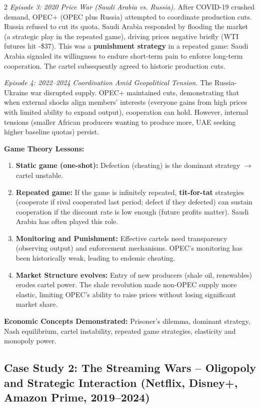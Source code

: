 \documentclass[10pt,a4paper]{article}
\begin{document}
\begin{multicols}{2}
\textit{Episode 3: 2020 Price War (Saudi Arabia vs. Russia).} After COVID-19 crushed demand, OPEC+ (OPEC plus Russia) attempted to coordinate production cuts. Russia refused to cut its quota. Saudi Arabia responded by flooding the market (a strategic play in the repeated game), driving prices negative briefly (WTI futures hit -\$37). This was a \textbf{punishment strategy} in a repeated game: Saudi Arabia signaled its willingness to endure short-term pain to enforce long-term cooperation. The cartel subsequently agreed to historic production cuts.

\textit{Episode 4: 2022--2024 Coordination Amid Geopolitical Tension.} The Russia-Ukraine war disrupted supply. OPEC+ maintained cuts, demonstrating that when external shocks align members' interests (everyone gains from high prices with limited ability to expand output), cooperation can hold. However, internal tensions (smaller African producers wanting to produce more, UAE seeking higher baseline quotas) persist.

\textbf{Game Theory Lessons:}
\begin{enumerate}[leftmargin=*,nosep]
    \item \textbf{Static game (one-shot):} Defection (cheating) is the dominant strategy $\to$ cartel unstable.
    \item \textbf{Repeated game:} If the game is infinitely repeated, \textbf{tit-for-tat} strategies (cooperate if rival cooperated last period; defect if they defected) can sustain cooperation if the discount rate is low enough (future profits matter). Saudi Arabia has often played this role.
    \item \textbf{Monitoring and Punishment:} Effective cartels need transparency (observing output) and enforcement mechanisms. OPEC's monitoring has been historically weak, leading to endemic cheating.
    \item \textbf{Market Structure evolves:} Entry of new producers (shale oil, renewables) erodes cartel power. The shale revolution made non-OPEC supply more elastic, limiting OPEC's ability to raise prices without losing significant market share.
\end{enumerate}

\textbf{Economic Concepts Demonstrated:} Prisoner's dilemma, dominant strategy, Nash equilibrium, cartel instability, repeated game strategies, elasticity and monopoly power.

\subsection*{Case Study 2: The Streaming Wars -- Oligopoly and Strategic Interaction (Netflix, Disney+, Amazon Prime, 2019--2024)}


\end{multicols}
\end{document}
